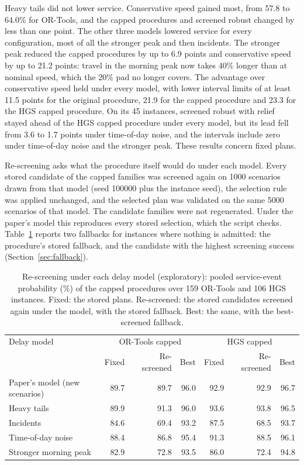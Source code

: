 Heavy tails did not lower service. Conservative speed gained most, from 57.8 to 64.0\% for OR-Tools, and the capped procedures and screened robust changed by less than one point. The other three models lowered service for every configuration, most of all the stronger peak and then incidents. The stronger peak reduced the capped procedures by up to 6.9 points and conservative speed by up to 21.2 points: travel in the morning peak now takes 40\% longer than at nominal speed, which the 20\% pad no longer covers. The advantage over conservative speed held under every model, with lower interval limits of at least 11.5 points for the original procedure, 21.9 for the capped procedure and 23.3 for the HGS capped procedure. On its 45 instances, screened robust with relief stayed ahead of the HGS capped procedure under every model, but its lead fell from 3.6 to 1.7 points under time-of-day noise, and the intervals include zero under time-of-day noise and the stronger peak. These results concern fixed plans.

Re-screening asks what the procedure itself would do under each model. Every stored candidate of the capped families was screened again on 1000 scenarios drawn from that model (seed 100000 plus the instance seed), the selection rule was applied unchanged, and the selected plan was validated on the same 5000 scenarios of that model. The candidate families were not regenerated. Under the paper's model this reproduces every stored selection, which the script checks. Table~\ref{tab:rescreen} reports two fallbacks for instances where nothing is admitted: the procedure's stored fallback, and the candidate with the highest screening success (Section~\ref{sec:fallback}).

\begin{table}[htbp]
\centering
\footnotesize
\setlength{\tabcolsep}{4pt}
\caption{Re-screening under each delay model (exploratory): pooled service-event probability (\%) of the capped procedures over 159 OR-Tools and 106 HGS instances. Fixed: the stored plans. Re-screened: the stored candidates screened again under the model, with the stored fallback. Best: the same, with the best-screened fallback.}
\label{tab:rescreen}
\begin{tabular}{@{}lrrrrrr@{}}
\toprule
Delay model & \multicolumn{3}{c}{OR-Tools capped} & \multicolumn{3}{c}{HGS capped}\\
 & Fixed & Re-screened & Best & Fixed & Re-screened & Best\\
\midrule
Paper's model (new scenarios) & 89.7 & 89.7 & 96.0 & 92.9 & 92.9 & 96.7\\
Heavy tails & 89.9 & 91.3 & 96.0 & 93.6 & 93.8 & 96.5\\
Incidents & 84.6 & 69.4 & 93.2 & 87.5 & 68.5 & 93.7\\
Time-of-day noise & 88.4 & 86.8 & 95.4 & 91.3 & 88.5 & 96.1\\
Stronger morning peak & 82.9 & 72.8 & 93.5 & 86.0 & 72.4 & 94.8\\
\bottomrule
\end{tabular}
\end{table}

